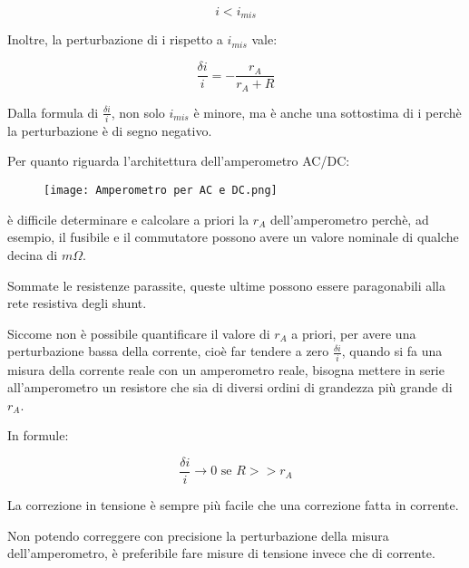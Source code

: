 {
    \Large 
    \begin{equation}
        i < i_{mis}
    \end{equation}
}

Inoltre, la perturbazione di i rispetto a $i_{mis}$ vale:

{
    \Large
    \begin{equation}
        \frac{\delta i}{i}
        = 
        -
        \frac{r_A}{r_A + R}
    \end{equation}
}

Dalla formula di $\frac{\delta i}{i}$, non solo $i_{mis}$ è minore, ma è anche una sottostima di i perchè la perturbazione è di segno negativo. \newline 

Per quanto riguarda l'architettura dell'amperometro AC/DC: 

\begin{figure}[h]
    \centering
    \texttt{[image: Amperometro per AC e DC.png]}
\end{figure}

è difficile determinare e calcolare a priori la $r_A$ dell'amperometro perchè, ad esempio, 
il fusibile e il commutatore possono avere un valore nominale  di qualche decina di $m \Omega$. \newline 

Sommate le resistenze parassite, 
queste ultime possono essere paragonabili alla rete resistiva degli shunt. \newline 

Siccome non è possibile quantificare il valore di $r_A$ a priori, per avere una perturbazione bassa della corrente, 
cioè far tendere a zero $\frac{\delta i}{i}$, 
quando si fa una misura della corrente reale con un amperometro reale, 
bisogna mettere in serie all'amperometro un resistore che sia di diversi ordini di grandezza più grande di $r_A$. \newline 

In formule:

{
    \Large
    \begin{equation}
            \frac{\delta i}{i} \to 0 \text{ se } R >> r_A
    \end{equation}
}

La correzione in tensione è sempre più facile che una correzione fatta in corrente. \newline 

Non potendo correggere con precisione la perturbazione della misura dell'amperometro, 
è preferibile fare misure di tensione invece che di corrente. \newline

